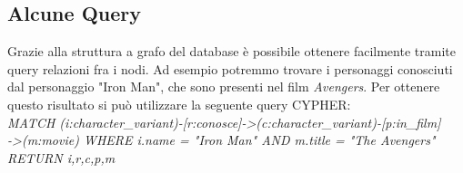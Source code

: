 \documentclass[
12pt, %
a4paper, %
oneside, %
headinclude,footinclude, %
BCOR5mm, %
]{scrartcl}
\begin{document}
\subsection{Alcune Query}
 Grazie alla struttura a grafo del database è possibile ottenere 
 facilmente tramite query relazioni fra i nodi. Ad esempio potremmo 
 trovare i personaggi conosciuti dal personaggio "Iron Man",
  che sono presenti nel film \textit{Avengers}. 
	Per ottenere questo risultato si può utilizzare la seguente query 
	CYPHER: \\\newline \textit{MATCH (i:character\_variant)-[r:conosce]->(c:character\_variant)-[p:in\_film]\\->(m:movie) WHERE i.name = "Iron Man"  AND m.title = "The Avengers" RETURN i,r,c,p,m} 




\renewcommand{\refname}{\spacedlowsmallcaps{References}} %




\end{document}
